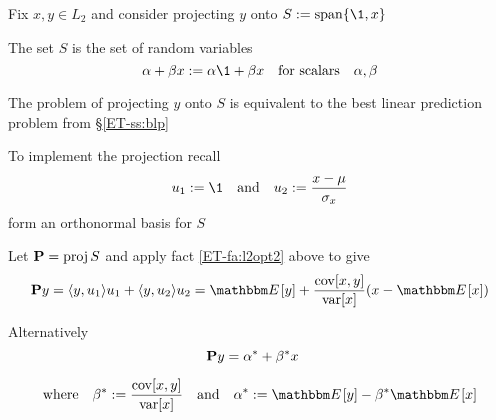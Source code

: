 \begin{frame}

    \vspace{2em}
    \Eg
   
    Fix $x, y \in L_2$ and consider projecting $y$ onto $S := \Span\{\1,
    x\}$
    
    The set $S$ is the set of random variables
    \begin{equation*}
         \alpha + \beta x 
         := \alpha \1 + \beta x
         \quad \text{for scalars} \quad
         \alpha, \beta   
    \end{equation*}
    
    The problem of projecting $y$ onto $S$ is equivalent to the best linear
    prediction problem from \S\ref{ET-ss:blp}
    
    To implement the projection recall 
    \begin{equation*}
        u_1 := \1 
        \quad \text{and} \quad
        u_2 := \frac{x - \mu}{\sigma_x}  
    \end{equation*}
    form an orthonormal basis for $S$
    
\end{frame}
    
\begin{frame}

    \vspace{2em} 
    Let $\mathbf P = \operatorname{proj} S$ and apply fact \eqref{ET-fa:l2opt2} above to give
    \begin{equation*}
        \boldP y 
         = \la y, u_1 \ra u_1 + \la y, u_2 \ra u_2
         = \EE[ y ] + 
            \frac{\cov[x, y]}{\var[x]}(x - \EE[x])
    \end{equation*}
    
    Alternatively
    \begin{equation*}
        \mathbf P y 
        = \alpha^* + \beta^* x
        \quad
    \end{equation*}
    
    \begin{equation*}
        \text{where} \quad
        \beta^* := \frac{\cov[x, y]}{\var[x]}
        \quad \text{and} \quad
        \alpha^* := \EE[y] - \beta^* \EE[x]
    \end{equation*}
\end{frame}

